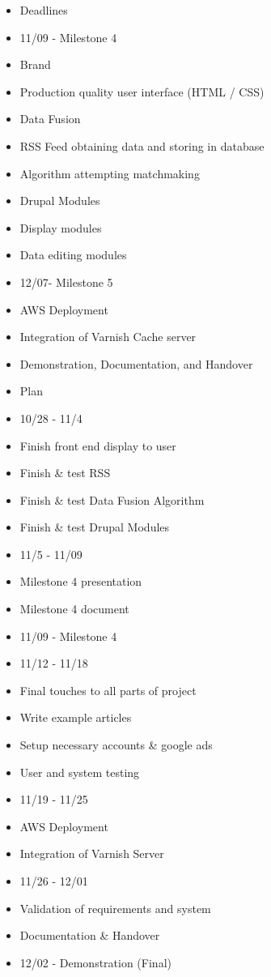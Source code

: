 \documentclass[12pt]{article} %
\begin{document}
\begin{itemize}
\item Deadlines
 	\setlength{\itemindent}{2em}
	\item 11/09 - Milestone 4
		 \setlength{\itemindent}{4em}
		\item Brand
		\item Production quality user interface (HTML / CSS)
		\item Data Fusion
		\item RSS Feed obtaining data and storing in database
		\item Algorithm attempting matchmaking
		\item Drupal Modules
		\item Display modules
		\item Data editing modules
 	\setlength{\itemindent}{2em}
	\item 12/07- Milestone 5
		 \setlength{\itemindent}{4em}
		\item AWS Deployment
		\item Integration of Varnish Cache server
		\item Demonstration, Documentation, and Handover
\setlength{\itemindent}{0em}
\item Plan
	\setlength{\itemindent}{2em}
	\item 10/28 - 11/4
		\setlength{\itemindent}{4em}
		\item Finish front end display to user
		\item Finish \& test RSS
		\item Finish \& test Data Fusion Algorithm
		\item Finish \& test Drupal Modules
	\setlength{\itemindent}{2em}
	\item 11/5 - 11/09
		\setlength{\itemindent}{4em}
		\item Milestone 4 presentation
		\item Milestone 4 document
	\setlength{\itemindent}{2em}
	\item 11/09 - Milestone 4
	\item 11/12 - 11/18
		\setlength{\itemindent}{4em}
		\item Final touches to all parts of project
		\item Write example articles
		\item Setup necessary accounts \& google ads
		\item User and system testing
	\setlength{\itemindent}{2em}
	\item 11/19 - 11/25
		\setlength{\itemindent}{4em}
		\item AWS Deployment
		\item Integration of Varnish Server
	\setlength{\itemindent}{2em}
	\item 11/26 - 12/01
		\setlength{\itemindent}{4em}
		\item Validation of requirements and system
		\item Documentation \& Handover
	\setlength{\itemindent}{2em}
	\item 12/02 - Demonstration (Final)
\end{itemize}
\end{document}
